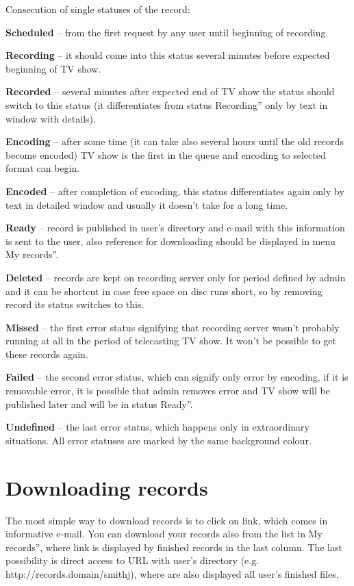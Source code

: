 Consecution of single statuses of the record:
\bitem
\item\textbf{Scheduled} -- from the first request by any user until beginning of recording.
\item\textbf{Recording} -- it should come into this status several minutes before expected beginning of TV show.
\item\textbf{Recorded} -- several minutes after expected end of TV show the status should switch to this status (it differentiates from status \quotedblbase Recording'' only by text in window with details).
\item\textbf{Encoding} -- after some time (it can take also several hours until the old records become encoded) TV show is the first in the queue and encoding to selected format can begin.
\item\textbf{Encoded} -- after completion of encoding, this status differentiates again only by text in detailed window and usually it doesn't take for a long time.
\item\textbf{Ready} -- record is published in user's directory and e-mail with this information is sent to the user, also reference for downloading should be displayed in menu \quotedblbase My records''.
\item\textbf{Deleted} -- records are kept on recording server only for period defined by admin and it can be shortcut in case free space on disc runs short, so by removing record its status switches to this.
\item\textbf{Missed} -- the first error status signifying that recording server wasn't probably running at all in the period of telecasting TV show. It won't be possible to get these records again.
\item\textbf{Failed} -- the second error status, which can signify only error by encoding, if it is removable error, it is possible that admin removes error and TV show will be published later and will be in status \quotedblbase Ready''.
\item\textbf{Undefined} -- the last error status, which happens only in extraordinary situations. All error statuses are marked by the same background colour.
\eitem

\section{Downloading records}
The most simple way to download records is to click on link, which comes in informative e-mail. You can download your records also from the list in \quotedblbase My records'', where link is displayed by finished records in the last column. The last possibility is direct access to URL with user's directory (e.g. http://records.domain/smithj), where are also displayed all user's finished files.

